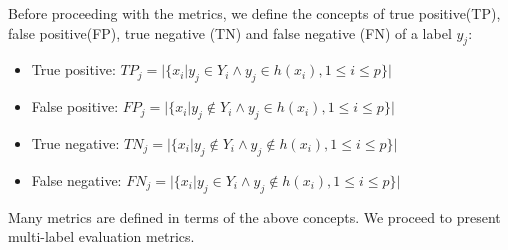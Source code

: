 \documentclass[12pt]{report}
\begin{document}
    Before proceeding with the metrics, we define the concepts of true positive(TP), false positive(FP),
    true negative (TN) and false negative (FN) of a label $y_j$:
		\begin{itemize}
			\item True positive:  $TP_j = |\{x_i | y_j \in Y_i \wedge y_j \in h(x_i), 1 \leq i \leq p \}|$
			\item False positive: $FP_j = |\{x_i | y_j \notin Y_i \wedge y_j \in h(x_i), 1 \leq i \leq p \}|$
			\item True negative: $TN_j = |\{x_i | y_j \notin Y_i \wedge y_j \notin h(x_i), 1 \leq i \leq p \}|$
			\item False negative: $FN_j = |\{x_i | y_j \in Y_i \wedge y_j \notin h(x_i), 1 \leq i \leq p \}|$
		\end{itemize}

    Many metrics are defined in terms of the above concepts. We proceed to
    present multi-label evaluation metrics.
\end{document}
